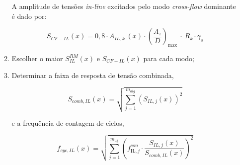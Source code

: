 \begin{itemize}
\begin{enumerate}

        A amplitude de tensões \textit{in-line} excitados pelo modo \textit{cross-flow} dominante é dado por:

       		\[S_{\mathit{CF-IL}}(x) = 0,8 \cdot A_{\mathit{IL}, \mathit{k}}~(x) \cdot {\left(\frac{A_{z}}{D}\right)}_{\max}~\cdot~R_k \cdot \gamma_s\]

    \item  Escolher o maior $S_\mathit{IL}^\mathit{RM}(x)$ e $S_{\mathit{CF-IL}}(x)$ para cada modo;

    \item Determinar a faixa de resposta de tensão combinada,

    \[S_{comb,IL}(x)=\sqrt{\sum_{j=1}^{m_{aig}}{\left(S_{IL,j}(x)\right)}^{2}}\]

    e a frequência de contagem de ciclos,

    \[f_{cyc,IL}(x)=\sqrt{\sum_{j=1}^{m_{\text{ug}}}{\left(f_{\text {IL}, j}^{con} \cdot \frac{S_{IL,j}(x)}{S_{comb,IL}(x)}\right)}^{2}}\]
    \end{enumerate}
\end{itemize}
